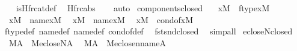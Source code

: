 \begin{isabellebody}
%
\isadelimproof
\ \ %
\endisadelimproof
%
\isatagproof
{}\isamarkupfalse%
\ is{\isacharunderscore}{\kern0pt}Hfrc{\isacharunderscore}{\kern0pt}at{\isacharunderscore}{\kern0pt}def\ \isamarkupfalse%
\ Hfrc{\isacharunderscore}{\kern0pt}abs\isanewline
\ \ \isamarkupfalse%
\ auto%
\endisatagproof
{\isafoldproof}%
%
\isadelimproof
\isanewline
%
\endisadelimproof
\isanewline
{}\isamarkupfalse%
\ components{\isacharunderscore}{\kern0pt}closed\ {\isacharcolon}{\kern0pt}\isanewline
\ \ {\isachardoublequoteopen}x{\isasymin}M\ {\isasymLongrightarrow}\ ftype{\isacharparenleft}{\kern0pt}x{\isacharparenright}{\kern0pt}{\isasymin}M{\isachardoublequoteclose}\isanewline
\ \ {\isachardoublequoteopen}x{\isasymin}M\ {\isasymLongrightarrow}\ name{}{\isacharparenleft}{\kern0pt}x{\isacharparenright}{\kern0pt}{\isasymin}M{\isachardoublequoteclose}\isanewline
\ \ {\isachardoublequoteopen}x{\isasymin}M\ {\isasymLongrightarrow}\ name{}{\isacharparenleft}{\kern0pt}x{\isacharparenright}{\kern0pt}{\isasymin}M{\isachardoublequoteclose}\isanewline
\ \ {\isachardoublequoteopen}x{\isasymin}M\ {\isasymLongrightarrow}\ cond{\isacharunderscore}{\kern0pt}of{\isacharparenleft}{\kern0pt}x{\isacharparenright}{\kern0pt}{\isasymin}M{\isachardoublequoteclose}\isanewline
%
\isadelimproof
\ \ %
\endisadelimproof
%
\isatagproof
{}\isamarkupfalse%
\ ftype{\isacharunderscore}{\kern0pt}def\ name{}{\isacharunderscore}{\kern0pt}def\ name{}{\isacharunderscore}{\kern0pt}def\ cond{\isacharunderscore}{\kern0pt}of{\isacharunderscore}{\kern0pt}def\ \isamarkupfalse%
\ fst{\isacharunderscore}{\kern0pt}snd{\isacharunderscore}{\kern0pt}closed\ \isamarkupfalse%
\ simp{\isacharunderscore}{\kern0pt}all%
\endisatagproof
{\isafoldproof}%
%
\isadelimproof
\isanewline
%
\endisadelimproof
\isanewline
{}\isamarkupfalse%
\ ecloseN{\isacharunderscore}{\kern0pt}closed{\isacharcolon}{\kern0pt}\isanewline
\ \ {\isachardoublequoteopen}{\isacharparenleft}{\kern0pt}{\isacharhash}{\kern0pt}{\isacharhash}{\kern0pt}M{\isacharparenright}{\kern0pt}{\isacharparenleft}{\kern0pt}A{\isacharparenright}{\kern0pt}\ {\isasymLongrightarrow}\ {\isacharparenleft}{\kern0pt}{\isacharhash}{\kern0pt}{\isacharhash}{\kern0pt}M{\isacharparenright}{\kern0pt}{\isacharparenleft}{\kern0pt}ecloseN{\isacharparenleft}{\kern0pt}A{\isacharparenright}{\kern0pt}{\isacharparenright}{\kern0pt}{\isachardoublequoteclose}\isanewline
\ \ {\isachardoublequoteopen}{\isacharparenleft}{\kern0pt}{\isacharhash}{\kern0pt}{\isacharhash}{\kern0pt}M{\isacharparenright}{\kern0pt}{\isacharparenleft}{\kern0pt}A{\isacharparenright}{\kern0pt}\ {\isasymLongrightarrow}\ {\isacharparenleft}{\kern0pt}{\isacharhash}{\kern0pt}{\isacharhash}{\kern0pt}M{\isacharparenright}{\kern0pt}{\isacharparenleft}{\kern0pt}eclose{\isacharunderscore}{\kern0pt}n{\isacharparenleft}{\kern0pt}name{}{\isacharcomma}{\kern0pt}A{\isacharparenright}{\kern0pt}{\isacharparenright}{\kern0pt}{\isachardoublequoteclose}\isanewline

\end{isabellebody}
